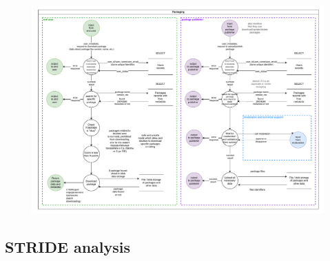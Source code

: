 \documentclass[letterpaper,12pt]{report}
\begin{document}
\begin{figure}[htpb!]
    \centering
    \includegraphics[width=1\textwidth]{figure_6}
    \caption[Feature: Packaging]
    \label{fig:figure6}
\end{figure}
\newpage

\subsection{STRIDE analysis}
\end{document}
